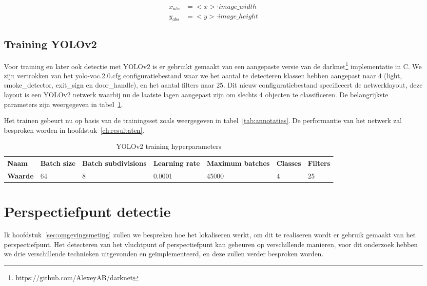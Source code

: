 \begin{equation} \label{eq:yolo_abs}
    \begin{split}
        x_{abs} &= <x> \cdot  image\_width \\
        y_{abs} &= <y> \cdot image\_height
    \end{split}
\end{equation}


\subsection{Training YOLOv2}

Voor training en later ook detectie met YOLOv2 is er gebruikt gemaakt van een aangepaste versie van de darknet\footnote{https://github.com/AlexeyAB/darknet} implementatie in C.
We zijn vertrokken van het yolo-voc.2.0.cfg configuratiebestand waar we het aantal te detecteren klassen hebben aangepast naar 4 (light, smoke\_detector, exit\_sign en door\_handle), en het aantal filters naar 25.
Dit nieuw configuratiebestand specificeert de netwerklayout, deze layout is een YOLOv2 netwerk waarbij nu de laatste lagen aangepast zijn om slechts 4 objecten te classificeren.
De belangrijkste parameters zijn weergegeven in tabel~\ref{tab:hyperparameters}.

Het trainen gebeurt nu op basis van de trainingsset zoals weergegeven in tabel~\ref{tab:annotaties}. De performantie van het netwerk zal besproken worden in hoofdstuk~\ref{ch:resultaten}.

\begin{table}[h]
    \centering
    \caption{YOLOv2 training hyperparameters} \label{tab:hyperparameters}
    \begin{tabular}{l | l | l | l | l | l | l}
        \textbf{Naam} & Batch size & Batch subdivisions & Learning rate & Maximum batches & Classes & Filters \\
        \hline
        \textbf{Waarde} & 64 & 8 & 0.0001 & 45000 & 4 & 25
    \end{tabular}
\end{table}


\section{Perspectiefpunt detectie}\label{sec:perspectiefpunt_detectie}

Ik hoofdstuk~\ref{sec:omgevingsmeting} zullen we bespreken hoe het lokaliseren werkt, om dit te realiseren wordt er gebruik gemaakt van het perspectiefpunt.
Het detecteren van het vluchtpunt of perspectiefpunt kan gebeuren op verschillende manieren, voor dit onderzoek hebben we drie verschillende technieken uitgevonden en ge\"{i}mplementeerd, en deze zullen verder besproken worden.

